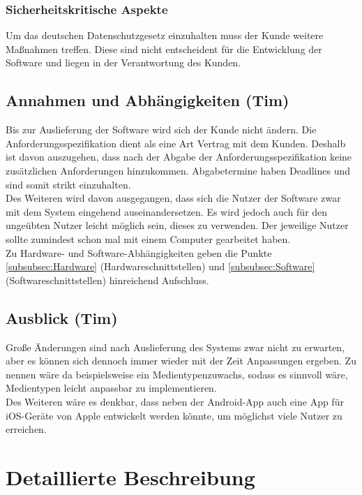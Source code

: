 \documentclass[fontsize=12pt,paper=a4,twoside]{scrartcl}
\begin{document}
\subsubsection{Sicherheitskritische Aspekte} \label{subsubsec:SicherheitsAspekte} Um das deutschen Datenschutzgesetz einzuhalten muss der Kunde weitere Maßnahmen treffen. Diese sind nicht entscheident für die Entwicklung der Software und liegen in der Verantwortung des Kunden.

\subsection{Annahmen und Abhängigkeiten (Tim)} \label{subsec:Annahmen} Bis zur Auslieferung der Software wird sich der Kunde nicht ändern. Die Anforderungsspezifikation dient als eine Art Vertrag mit dem Kunden. Deshalb ist davon auszugehen, dass nach der Abgabe der Anforderungsspezifikation keine zusätzlichen Anforderungen hinzukommen. Abgabetermine haben Deadlines und sind somit strikt einzuhalten.\\
\newpage Des Weiteren wird davon ausgegangen, dass sich die Nutzer der Software zwar mit dem System eingehend auseinandersetzen. Es wird jedoch auch für den ungeübten Nutzer leicht möglich sein, dieses zu verwenden. Der jeweilige Nutzer sollte zumindest schon mal mit einem Computer gearbeitet haben.\\
Zu Hardware- und Software-Abhängigkeiten geben die Punkte \ref{subsubsec:Hardware} (Hardwareschnittstellen) und \ref{subsubsec:Software} (Softwareschnittstellen) hinreichend Aufschluss.

\subsection{Ausblick (Tim)} \label{subsec:Ausblick} Große Änderungen sind nach Auslieferung des Systems zwar nicht zu erwarten, aber es können sich dennoch immer wieder mit der Zeit Anpassungen ergeben. Zu nennen wäre da beispielsweise ein Medientypenzuwachs, sodass es sinnvoll wäre, Medientypen leicht anpassbar zu implementieren. \\
Des Weiteren wäre es denkbar, dass neben der Android-App auch eine App für iOS-Geräte von Apple entwickelt werden könnte, um möglichst viele Nutzer zu erreichen.

\section{Detaillierte Beschreibung} \label{sec:DetaillierteBeschreibung} 
\end{document}
